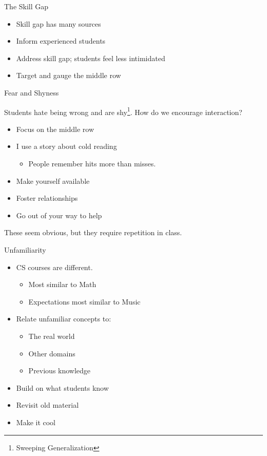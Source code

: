 \documentclass[11pt]{beamer}
\begin{document}
\begin{frame}{The Skill Gap}
	\begin{itemize}
		\item Skill gap has many sources
		\item Inform experienced students
		\item Address skill gap; students feel less intimidated
		\item Target and gauge the middle row
	\end{itemize}
\end{frame}



\begin{frame}{Fear and Shyness}
	
	Students hate being wrong and are shy\footnote{Sweeping Generalization}.  How do we encourage interaction?
	\pause
	\begin{itemize}
		\item Focus on the middle row
		\pause
		
		\item I use a story about cold reading
		\begin{itemize}
			\item People remember hits more than misses.
		\end{itemize}
		\pause
		
		\item Make yourself available 
		\pause
		
		\item Foster relationships
		\pause
		
		\item Go out of your way to help
	\end{itemize}
	\pause
	These seem obvious, but they require repetition in class.
\end{frame}


\begin{frame}{Unfamiliarity}
	\begin{itemize}
		\item CS courses are different.
		\begin{itemize}
			\item Most similar to Math
			\item Expectations most similar to Music
		\end{itemize}
		
		\item Relate unfamiliar concepts to:
		\begin{itemize}
			\item The real world
			\item Other domains
			\item Previous knowledge
		\end{itemize}
		\item Build on what students know
		\item Revisit old material
		\item Make it cool
		
	\end{itemize}
\end{frame}
\end{document}
